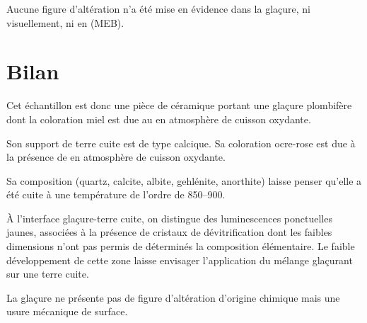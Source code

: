 Aucune figure d'altération n'a été mise en évidence dans la glaçure, 
ni visuellement, ni en \MEB[ie] (MEB).


\section{Bilan}

Cet échantillon est donc une pièce de céramique portant une glaçure 
plombifère dont la coloration miel est due au  en atmosphère 
de cuisson oxydante.

Son support de terre cuite est de type calcique. Sa coloration 
ocre-rose est due à la présence de  en atmosphère de 
cuisson oxydante.

Sa composition \cristallo (quartz, calcite, albite, gehlénite, 
anorthite) laisse penser qu'elle a été cuite à une température de 
l'ordre de \SIrange[range-phrase=\ à\ ]{850}{900}{\degC}.

À l'interface glaçure-terre cuite, on distingue des luminescences 
ponctuelles jaunes, associées à la présence de cristaux de 
dévitrification dont les faibles dimensions n'ont pas permis de 
déterminés la composition élémentaire. Le faible développement de 
cette zone laisse envisager l'application du mélange glaçurant sur 
une terre cuite.

La glaçure ne présente pas de figure d'altération d'origine chimique 
mais une usure mécanique de surface.
